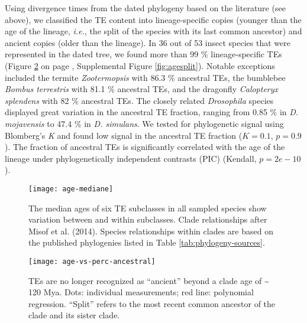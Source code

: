 Using divergence times from the dated phylogeny based on the literature
(see above), we classified the TE content into lineage-specific copies
(younger than the age of the lineage, \emph{i.e.}, the split of the
species with its last common ancestor) and ancient copies (older than
the lineage). In 36 out of 53 insect species that were represented in
the dated tree, we found more than 99 \% lineage-specific TEs (Figure
\ref{fig:age-vs-perc-ancestral} on page
\pageref{fig:age-vs-perc-ancestral},
Supplemental Figure \ref{fig:agesplit}). Notable exceptions included the termite
\emph{Zootermopsis} with 86.3 \% ancestral TEs, the bumblebee
\emph{Bombus terrestris} with 81.1 \% ancestral TEs, and the dragonfly
\emph{Calopteryx splendens} with 82 \% ancestral TEs. The closely
related \emph{Drosophila} species displayed great variation in the
ancestral TE fraction, ranging from 0.85 \% in \emph{D. mojavensis} to
47.4 \% in \emph{D. simulans}. We tested for phylogenetic signal using
Blomberg's \emph{K} and found low signal in the ancestral TE fraction
(\(K = 0.1\), \(p = 0.9\)). The fraction of ancestral TEs
is significantly correlated with the age of the lineage under
phylogenetically independent contrasts (PIC) (Kendall,
\(p = 2e-10\)).

\begin{figure}[h!]
\begin{center}
\texttt{[image: age-mediane]}
\caption[Median ages of TE in arthropods]{{The median ages of six TE subclasses in all sampled species show
variation between and within subclasses. Clade relationships after Misof
et al. (2014). Species relationships within clades are based on the
published phylogenies listed in Table \ref{tab:phylogeny-sources}.
{\label{fig:age-mediane}}%
}}
\end{center}
\end{figure}

\begin{figure}[h!]
\begin{center}
\texttt{[image: age-vs-perc-ancestral]}
\caption[TEs are no longer recognized as ``ancient'' beyond a clade age of
\textasciitilde{} 120 Mya]{{TEs are no longer recognized as ``ancient'' beyond a clade age of
\textasciitilde{} 120 Mya. Dots: individual measurements; red line:
polynomial regression. ``Split'' refers to the most recent common
ancestor of the clade and its sister clade.
{\label{fig:age-vs-perc-ancestral}}%
}}
\end{center}
\end{figure}

